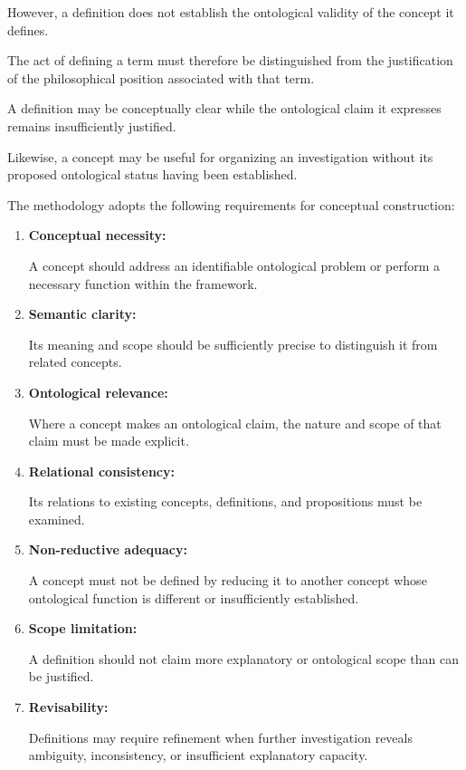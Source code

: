 However, a definition does not establish
the ontological validity of the concept
it defines.

The act of defining a term must therefore
be distinguished from the justification
of the philosophical position associated
with that term.

A definition may be conceptually clear
while the ontological claim it expresses
remains insufficiently justified.

Likewise, a concept may be useful for
organizing an investigation without
its proposed ontological status having
been established.

The methodology adopts the following
requirements for conceptual construction:

\begin{enumerate}

    \item \textbf{Conceptual necessity:}

    A concept should address an identifiable
    ontological problem or perform a necessary
    function within the framework.

    \item \textbf{Semantic clarity:}

    Its meaning and scope should be sufficiently
    precise to distinguish it from related
    concepts.

    \item \textbf{Ontological relevance:}

    Where a concept makes an ontological
    claim, the nature and scope of that
    claim must be made explicit.

    \item \textbf{Relational consistency:}

    Its relations to existing concepts,
    definitions, and propositions must
    be examined.

    \item \textbf{Non-reductive adequacy:}

    A concept must not be defined by
    reducing it to another concept whose
    ontological function is different
    or insufficiently established.

    \item \textbf{Scope limitation:}

    A definition should not claim more
    explanatory or ontological scope
    than can be justified.

    \item \textbf{Revisability:}

    Definitions may require refinement
    when further investigation reveals
    ambiguity, inconsistency, or insufficient
    explanatory capacity.

\end{enumerate}

